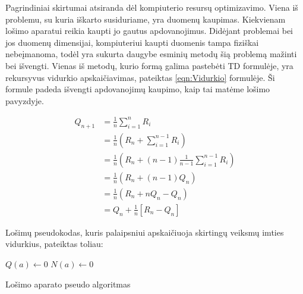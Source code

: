 \documentclass[a4paper, 12pt]{article}
\begin{document}
Pagrindiniai skirtumai atsiranda dėl kompiuterio resursų optimizavimo. Viena iš problemu, su kuria iškarto susiduriame, yra duomenų kaupimas. Kiekvienam lošimo aparatui reikia kaupti jo gautus apdovanojimus. Didėjant problemai bei jos duomenų dimensijai, kompiuteriui kaupti duomenis tampa fiziškai nebeįmanoma, todėl yra sukurta daugybe esminių metodų šią problemą mažinti bei išvengti. Vienas iš metodų, kurio formą galima pastebėti TD formulėje, yra rekursyvus vidurkio apskaičiavimas, pateiktas \ref{eqn:Vidurkio} formulėje. Ši formule padeda išvengti apdovanojimų kaupimo, kaip tai matėme lošimo pavyzdyje.

\begin{equation}
\label{eqn:Vidurkio}
\begin{aligned}
Q_{n+1} &=\frac{1}{n} \sum_{i=1}^{n} R_{i} \\
&=\frac{1}{n}\left(R_{n}+\sum_{i=1}^{n-1} R_{i}\right) \\
&=\frac{1}{n}\left(R_{n}+(n-1) \frac{1}{n-1} \sum_{i=1}^{n-1} R_{i}\right) \\
&=\frac{1}{n}\left(R_{n}+(n-1) Q_{n}\right) \\
&=\frac{1}{n}\left(R_{n}+n Q_{n}-Q_{n}\right) \\
&=Q_{n}+\frac{1}{n}\left[R_{n}-Q_{n}\right]
\end{aligned}
\end{equation}

Lošimų pseudokodas, kuris palaipsniui apskaičiuoja skirtingų veiksmų imties vidurkius, pateiktas toliau:

\begin{algorithm}[H]
\label{LosimuAlgo}
\SetAlgoLined

$Q(a) \leftarrow 0$\;
$N(a) \leftarrow 0$\;

 \caption{Lošimo aparato pseudo algoritmas}
\end{algorithm}
\end{document}
